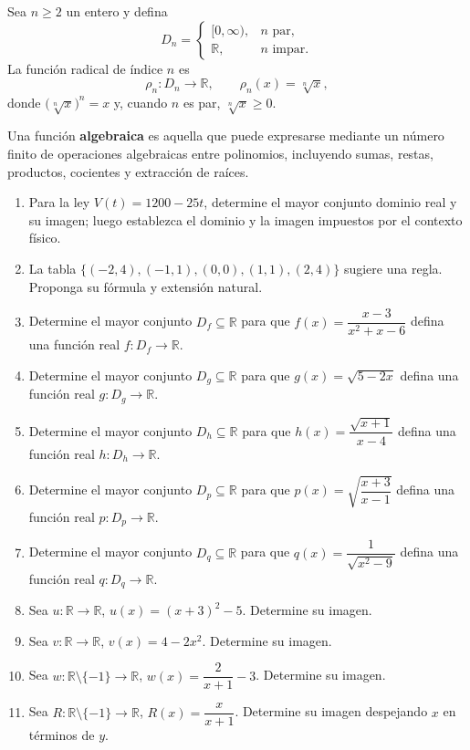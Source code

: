 \begin{definicion}
Sea $n\geq2$ un entero y defina
\[
D_n=
\begin{cases}
[0,\infty),& n\text{ par},\\
\mathbb{R},& n\text{ impar}.
\end{cases}
\]
La función radical de índice $n$ es
\[
\rho_n:D_n\to\mathbb{R},\qquad \rho_n(x)=\sqrt[n]{x},
\]
donde $\bigl(\sqrt[n]{x}\bigr)^n=x$ y, cuando $n$ es par, $\sqrt[n]{x}\geq0$.
\end{definicion}

\begin{definicion}
Una función \textbf{algebraica} es aquella que puede expresarse mediante un número finito de operaciones algebraicas entre polinomios, incluyendo sumas, restas, productos, cocientes y extracción de raíces.
\end{definicion}

\begin{ejercicios}
\begin{enumerate}
  \item Para la ley $V(t)=1200-25t$, determine el mayor conjunto dominio real y su imagen; luego establezca el dominio y la imagen impuestos por el contexto físico.
  \item La tabla $\{(-2,4),(-1,1),(0,0),(1,1),(2,4)\}$ sugiere una regla. Proponga su fórmula y extensión natural.
  \item Determine el mayor conjunto $D_f\subseteq\mathbb{R}$ para que $f(x)=\dfrac{x-3}{x^2+x-6}$ defina una función real $f:D_f\to\mathbb{R}$.
  \item Determine el mayor conjunto $D_g\subseteq\mathbb{R}$ para que $g(x)=\sqrt{5-2x}$ defina una función real $g:D_g\to\mathbb{R}$.
  \item Determine el mayor conjunto $D_h\subseteq\mathbb{R}$ para que $h(x)=\dfrac{\sqrt{x+1}}{x-4}$ defina una función real $h:D_h\to\mathbb{R}$.
  \item Determine el mayor conjunto $D_p\subseteq\mathbb{R}$ para que $p(x)=\sqrt{\dfrac{x+3}{x-1}}$ defina una función real $p:D_p\to\mathbb{R}$.
  \item Determine el mayor conjunto $D_q\subseteq\mathbb{R}$ para que $q(x)=\dfrac{1}{\sqrt{x^2-9}}$ defina una función real $q:D_q\to\mathbb{R}$.
  \item Sea $u:\mathbb{R}\to\mathbb{R}$, $u(x)=(x+3)^2-5$. Determine su imagen.
  \item Sea $v:\mathbb{R}\to\mathbb{R}$, $v(x)=4-2x^2$. Determine su imagen.
  \item Sea $w:\mathbb{R}\setminus\{-1\}\to\mathbb{R}$, $w(x)=\dfrac{2}{x+1}-3$. Determine su imagen.
  \item Sea $R:\mathbb{R}\setminus\{-1\}\to\mathbb{R}$, $R(x)=\dfrac{x}{x+1}$. Determine su imagen despejando $x$ en términos de $y$.
\end{enumerate}
\end{ejercicios}

